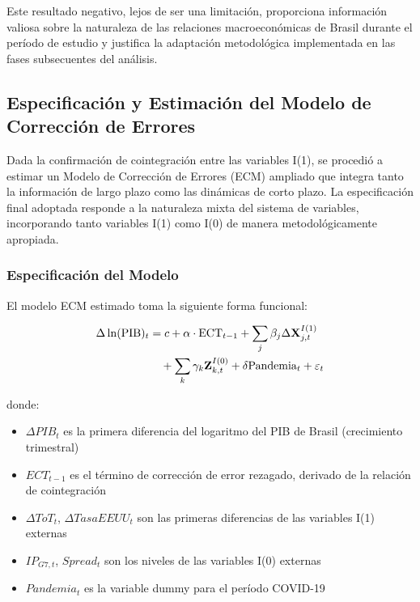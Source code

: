 \documentclass[3p,11pt]{elsarticle}
\begin{document}
Este resultado negativo, lejos de ser una limitación, proporciona información valiosa sobre la naturaleza de las relaciones macroeconómicas de Brasil durante el período de estudio y justifica la adaptación metodológica implementada en las fases subsecuentes del análisis.

\subsection{Especificación y Estimación del Modelo de Corrección de Errores}

Dada la confirmación de cointegración entre las variables I(1), se procedió a estimar un Modelo de Corrección de Errores (ECM) ampliado que integra tanto la información de largo plazo como las dinámicas de corto plazo. La especificación final adoptada responde a la naturaleza mixta del sistema de variables, incorporando tanto variables I(1) como I(0) de manera metodológicamente apropiada.

\subsubsection{Especificación del Modelo}

El modelo ECM estimado toma la siguiente forma funcional:

\begin{align}
\Delta \ln(\text{PIB})_{t} &= c + \alpha \cdot \text{ECT}_{t-1} + \sum_{j} \beta_j \Delta \mathbf{X}_{j,t}^{I(1)} \notag \\
&\quad + \sum_{k} \gamma_k \mathbf{Z}_{k,t}^{I(0)} + \delta \text{Pandemia}_{t} + \varepsilon_{t} \label{eq:ecm_main}
\end{align}

donde:
\begin{itemize}
    \item $\Delta PIB_{t}$ es la primera diferencia del logaritmo del PIB de Brasil (crecimiento trimestral)
    \item $ECT_{t-1}$ es el término de corrección de error rezagado, derivado de la relación de cointegración
    \item $\Delta ToT_{t}$, $\Delta TasaEEUU_{t}$ son las primeras diferencias de las variables I(1) externas
    \item $IP_{G7,t}$, $Spread_{t}$ son los niveles de las variables I(0) externas
    \item $Pandemia_{t}$ es la variable dummy para el período COVID-19
\end{itemize}
\end{document}
